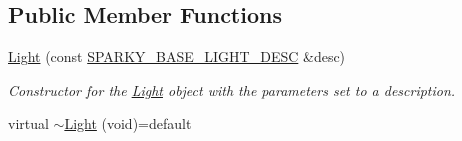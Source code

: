 \subsection*{Public Member Functions}
\begin{DoxyCompactItemize}
\item 
\hyperlink{classsparky_1_1_light_a35f8e3c1d4d3fe1973ce52b0723a3d80}{Light} (const \hyperlink{structsparky_1_1_s_p_a_r_k_y___b_a_s_e___l_i_g_h_t___d_e_s_c}{S\+P\+A\+R\+K\+Y\+\_\+\+B\+A\+S\+E\+\_\+\+L\+I\+G\+H\+T\+\_\+\+D\+E\+SC} \&desc)
\begin{DoxyCompactList}\small\item\em Constructor for the \hyperlink{classsparky_1_1_light}{Light} object with the parameters set to a description. \end{DoxyCompactList}\item 
virtual \hyperlink{classsparky_1_1_light_a3a69f6f1438240ed834548fb5b5fb9a1}{$\sim$\+Light} (void)=default\hypertarget{classsparky_1_1_light_a3a69f6f1438240ed834548fb5b5fb9a1}{}\label{classsparky_1_1_light_a3a69f6f1438240ed834548fb5b5fb9a1}


\end{DoxyCompactItemize}
